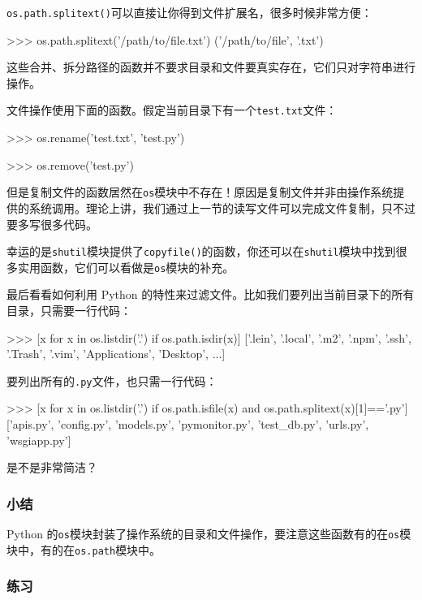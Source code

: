 \texttt{os.path.splitext()}可以直接让你得到文件扩展名，很多时候非常方便：

\begin{pythoncode}
>>> os.path.splitext('/path/to/file.txt')
('/path/to/file', '.txt')
\end{pythoncode}

这些合并、拆分路径的函数并不要求目录和文件要真实存在，它们只对字符串进行操作。

文件操作使用下面的函数。假定当前目录下有一个\texttt{test.txt}文件：

\begin{pythoncode}
>>> os.rename('test.txt', 'test.py')

>>> os.remove('test.py')
\end{pythoncode}

但是复制文件的函数居然在\texttt{os}模块中不存在！原因是复制文件并非由操作系统提供的系统调用。理论上讲，我们通过上一节的读写文件可以完成文件复制，只不过要多写很多代码。

幸运的是\texttt{shutil}模块提供了\texttt{copyfile()}的函数，你还可以在\texttt{shutil}模块中找到很多实用函数，它们可以看做是\texttt{os}模块的补充。

最后看看如何利用 Python
的特性来过滤文件。比如我们要列出当前目录下的所有目录，只需要一行代码：

\begin{pythoncode}
>>> [x for x in os.listdir('.') if os.path.isdir(x)]
['.lein', '.local', '.m2', '.npm', '.ssh', '.Trash', '.vim', 'Applications', 'Desktop', ...]
\end{pythoncode}

要列出所有的\texttt{.py}文件，也只需一行代码：

\begin{pythoncode}
>>> [x for x in os.listdir('.') if os.path.isfile(x) and os.path.splitext(x)[1]=='.py']
['apis.py', 'config.py', 'models.py', 'pymonitor.py', 'test_db.py', 'urls.py', 'wsgiapp.py']
\end{pythoncode}

是不是非常简洁？

\hypertarget{ux5c0fux7ed3}{%
\subsubsection{小结}\label{ux5c0fux7ed3}}

Python
的\texttt{os}模块封装了操作系统的目录和文件操作，要注意这些函数有的在\texttt{os}模块中，有的在\texttt{os.path}模块中。

\hypertarget{ux7ec3ux4e60}{%
\subsubsection{练习}\label{ux7ec3ux4e60}}

